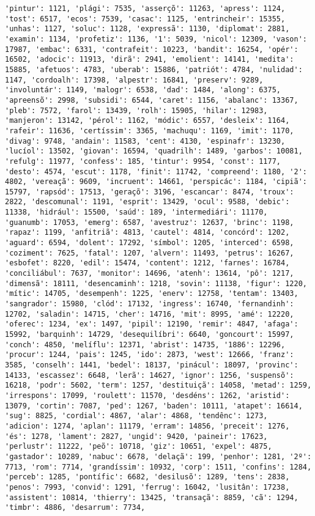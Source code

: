 \begin{Verbatim}[commandchars=\\\{\}]
'pintur': 1121, 'plági': 7535, 'asserçõ': 11263, 'apress': 1124, 'tost': 6517, 'ecos': 7539, 'casac': 1125, 'entrincheir': 15355, 'unhas': 1127, 'soluc': 1128, 'expressã': 1130, 'diplomat': 2881, 'examin': 1134, 'profetiz': 1136, '1': 5039, 'nicol': 12309, 'vason': 17987, 'embac': 6331, 'contrafeit': 10223, 'bandit': 16254, 'opér': 16502, 'adocic': 11913, 'dirã': 2941, 'emolient': 14141, 'medita': 15885, 'afetuos': 4783, 'uberab': 15886, 'patriót': 4784, 'nulidad': 1147, 'cordoalh': 17398, 'alpestr': 16841, 'preserv': 9289, 'involuntár': 1149, 'malogr': 6538, 'dad': 1484, 'along': 6375, 'apreensõ': 2998, 'subsidi': 6544, 'caret': 1156, 'abalanc': 13367, 'pleb': 7572, 'farol': 13439, 'rolh': 15905, 'hilar': 12983, 'manjeron': 13142, 'pérol': 1162, 'módic': 6557, 'desleix': 1164, 'rafeir': 11636, 'certíssim': 3365, 'machuqu': 1169, 'imit': 1170, 'divag': 9748, 'andain': 11583, 'cent': 4130, 'espinafr': 13230, 'lucíol': 13502, 'giovan': 16594, 'quadrilh': 1489, 'garbos': 10081, 'refulg': 11977, 'confess': 185, 'tintur': 9954, 'const': 1177, 'desto': 4574, 'escut': 1178, 'finit': 11742, 'compreend': 1180, '2': 4802, 'vereaçã': 9609, 'incruent': 14661, 'perspicác': 1184, 'cipiã': 15797, 'rapsód': 17513, 'geraçõ': 3196, 'escancar': 8474, 'troux': 2822, 'descomunal': 1191, 'esprit': 13429, 'ocul': 9588, 'debic': 11338, 'hidrául': 15500, 'saúd': 189, 'intermediári': 11170, 'guanumb': 17053, 'emerg': 6587, 'avestruz': 12637, 'brinc': 1198, 'rapaz': 1199, 'anfitriã': 4813, 'cautel': 4814, 'concórd': 1202, 'aguard': 6594, 'dolent': 17292, 'símbol': 1205, 'interced': 6598, 'coziment': 7625, 'fatal': 1207, 'alvern': 11493, 'petrus': 16267, 'esbofet': 8220, 'edil': 15474, 'content': 1212, 'farnes': 16784, 'conciliábul': 7637, 'monitor': 14696, 'atenh': 13614, 'pô': 1217, 'dimensã': 18111, 'desencaminh': 1218, 'sovin': 11138, 'figur': 1220, 'mític': 14705, 'desempenh': 1225, 'enerv': 12758, 'tentam': 13403, 'sangrador': 15980, 'clód': 17132, 'ingress': 16740, 'fernandinh': 12702, 'saladin': 14715, 'cher': 14716, 'mit': 8995, 'amé': 12220, 'oferec': 1234, 'ex': 1497, 'pipil': 12190, 'remir': 4847, 'afaga': 15992, 'barquinh': 14729, 'desequilíbri': 6640, 'goncourt': 15997, 'conch': 4850, 'melíflu': 12371, 'abrist': 14735, '1886': 12296, 'procur': 1244, 'pais': 1245, 'ido': 2873, 'west': 12666, 'franz': 3585, 'conselh': 1441, 'bedel': 18137, 'pinácul': 18097, 'provinc': 14133, 'escassez': 6648, 'lerã': 14627, 'ignor': 1256, 'suspensõ': 16218, 'podr': 5602, 'term': 1257, 'destituiçã': 14058, 'metad': 1259, 'irrespons': 17099, 'roulett': 11570, 'desdéns': 1262, 'aristid': 13079, 'cortin': 7087, 'ped': 1267, 'baden': 10111, 'atapet': 16614, 'sug': 8825, 'cordial': 4867, 'alar': 4868, 'tendênc': 1273, 'adicion': 1274, 'aplan': 11179, 'erram': 14856, 'preceit': 1276, 'és': 1278, 'lament': 2827, 'ungid': 9420, 'paineir': 17623, 'perlustr': 11222, 'peõ': 10718, 'giz': 10651, 'expel': 4875, 'gastador': 10289, 'nabuc': 6678, 'delaçã': 199, 'penhor': 1281, '2º': 7713, 'rom': 7714, 'grandíssim': 10932, 'corp': 1511, 'confins': 1284, 'perceb': 1285, 'pontífic': 6682, 'desilusõ': 1289, 'tens': 2838, 'penos': 7993, 'convid': 1291, 'ferrug': 16042, 'lusitân': 17238, 'assistent': 10814, 'thierry': 13425, 'transaçã': 8859, 'cã': 1294, 'timbr': 4886, 'desarrum': 7734, 
\end{Verbatim}
